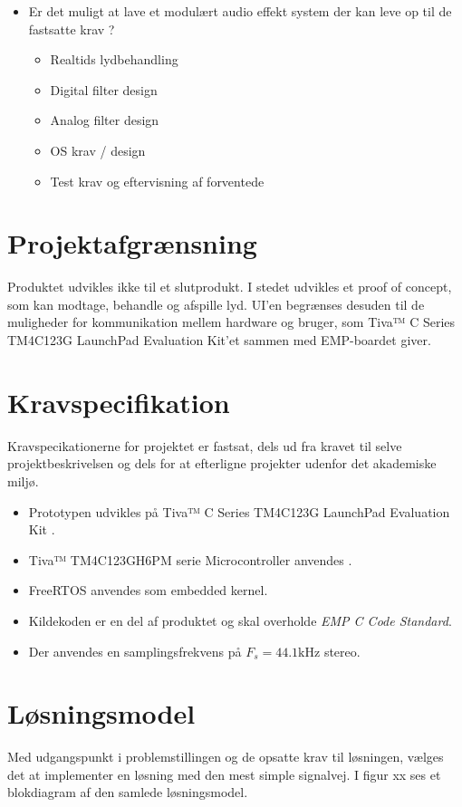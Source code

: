 \begin{itemize}
	\item Er det muligt at lave et modulært audio effekt system der kan leve op til de fastsatte krav ? 

	\begin{itemize}
		
		\item Realtids lydbehandling 
		\item Digital filter design
		\item Analog filter design
		\item OS krav / design
		\item Test krav og eftervisning af forventede
	\end{itemize}
\end{itemize}

\section{Projektafgrænsning}
Produktet udvikles ikke til et slutprodukt. 
I stedet udvikles et proof of concept, som kan modtage, behandle og afspille lyd. 
UI'en begrænses desuden til de muligheder for kommunikation mellem hardware og bruger, som Tiva™ C Series TM4C123G LaunchPad Evaluation Kit'et sammen med EMP-boardet giver. 

\section{Kravspecifikation} 
Kravspecikationerne for projektet er fastsat, dels ud fra kravet til selve projektbeskrivelsen og dels for at efterligne projekter udenfor det akademiske miljø.

\begin{itemize}[noitemsep]
	\item Prototypen udvikles på Tiva™ C Series TM4C123G LaunchPad Evaluation Kit \cite{spmt281a}.
	\item Tiva™ TM4C123GH6PM serie Microcontroller anvendes \cite{spmu296}.
	\item FreeRTOS anvendes som embedded kernel.
	\item Kildekoden er en del af produktet og skal overholde \textit{EMP C Code Standard}\cite{emp-c}.
	\item Der anvendes en samplingsfrekvens på $F_s = 44.1 \si{\kilo\hertz}$ stereo.
\end{itemize}


\section{Løsningsmodel}
Med udgangspunkt i problemstillingen og de opsatte krav til løsningen, vælges det at implementer en løsning med den mest simple signalvej.
I figur xx ses et blokdiagram af den samlede løsningsmodel.

